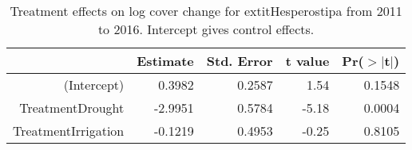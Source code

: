 \begin{table}[ht]
\centering
\caption{Treatment effects on log cover change for 	extit{Hesperostipa} from 2011 to 2016. Intercept gives control effects.} 
\label{table:changeHECO}
\begin{tabular}{rrrrr}
  \hline
 & Estimate & Std. Error & t value & Pr($>$$|$t$|$) \\ 
  \hline
(Intercept) & 0.3982 & 0.2587 & 1.54 & 0.1548 \\ 
  TreatmentDrought & -2.9951 & 0.5784 & -5.18 & 0.0004 \\ 
  TreatmentIrrigation & -0.1219 & 0.4953 & -0.25 & 0.8105 \\ 
   \hline
\end{tabular}
\end{table}
